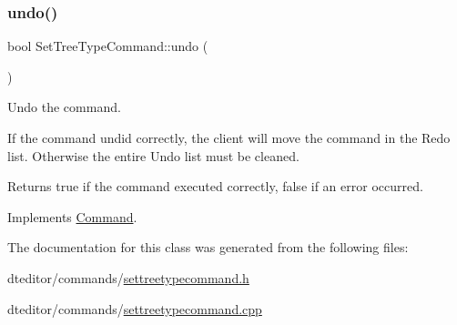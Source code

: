 \subsubsection{\texorpdfstring{undo()}{undo()}}
{\footnotesize\ttfamily bool Set\+Tree\+Type\+Command\+::undo (\begin{DoxyParamCaption}{ }\end{DoxyParamCaption})\hspace{0.3cm}{\ttfamily [virtual]}}



Undo the command. 

If the command undid correctly, the client will move the command in the Redo list. Otherwise the entire Undo list must be cleaned. \begin{DoxyReturn}{Returns}
true if the command executed correctly, false if an error occurred. 
\end{DoxyReturn}


Implements \mbox{\hyperlink{class_command_aa89348c98fd2194f1617d70f57a3ae6c}{Command}}.



The documentation for this class was generated from the following files\+:\begin{DoxyCompactItemize}
\item 
dteditor/commands/\mbox{\hyperlink{settreetypecommand_8h}{settreetypecommand.\+h}}\item 
dteditor/commands/\mbox{\hyperlink{settreetypecommand_8cpp}{settreetypecommand.\+cpp}}\end{DoxyCompactItemize}
